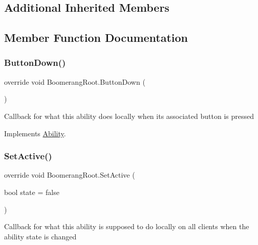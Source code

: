 \subsection*{Additional Inherited Members}


\subsection{Member Function Documentation}
\hypertarget{class_boomerang_root_a24efe6d7fc4691ad985c05c649a8b7d8}{}\label{class_boomerang_root_a24efe6d7fc4691ad985c05c649a8b7d8} 
\subsubsection{\texorpdfstring{Button\+Down()}{ButtonDown()}}
{\footnotesize\ttfamily override void Boomerang\+Root.\+Button\+Down (\begin{DoxyParamCaption}{ }\end{DoxyParamCaption})\hspace{0.3cm}{\ttfamily [virtual]}}



Callback for what this ability does locally when its associated button is pressed 



Implements \hyperlink{class_ability_a7722265862f8b29828315725415ce266}{Ability}.

\hypertarget{class_boomerang_root_ada0fc97c2ae52051df846fe6434f33aa}{}\label{class_boomerang_root_ada0fc97c2ae52051df846fe6434f33aa} 
\subsubsection{\texorpdfstring{Set\+Active()}{SetActive()}}
{\footnotesize\ttfamily override void Boomerang\+Root.\+Set\+Active (\begin{DoxyParamCaption}\item[{bool}]{state = {\ttfamily false} }\end{DoxyParamCaption})\hspace{0.3cm}{\ttfamily [virtual]}}



Callback for what this ability is supposed to do locally on all clients when the ability state is changed 


